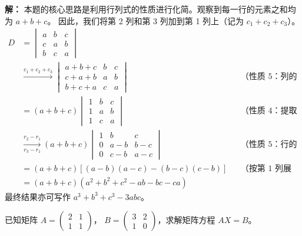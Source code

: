 \documentclass[a4paper, 12pt]{ctexart}
\begin{document}
\noindent\textbf{解：}
本题的核心思路是利用行列式的性质进行化简。观察到每一行的元素之和均为 $a+b+c$。
因此，我们将第 2 列和第 3 列加到第 1 列上（记为 $c_1 + c_2 + c_3$）。
\begin{align*}
    D &= \begin{vmatrix}
        a & b & c \\
        c & a & b \\
        b & c & a
        \end{vmatrix} \\
        &\xrightarrow{c_1+c_2+c_3} \begin{vmatrix}
        a+b+c & b & c \\
        c+a+b & a & b \\
        b+c+a & c & a
        \end{vmatrix} && \text{（性质 5：列的倍加，值不变）} \\
        &= (a+b+c) \begin{vmatrix}
        1 & b & c \\
        1 & a & b \\
        1 & c & a
        \end{vmatrix} && \text{（性质 4：提取第 1 列的公因子）} \\
        &\xrightarrow[r_3-r_1]{r_2-r_1} (a+b+c) \begin{vmatrix}
        1 & b & c \\
        0 & a-b & b-c \\
        0 & c-b & a-c
        \end{vmatrix} && \text{（性质 5：行的倍加，值不变）} \\
        &= (a+b+c) [ (a-b)(a-c) - (b-c)(c-b) ] && \text{（按第 1 列展开）} \\
        &= (a+b+c) (a^2+b^2+c^2-ab-bc-ca)
\end{align*}
最终结果亦可写作 $a^3+b^3+c^3-3abc$。

\vspace{1cm}

\begin{exercise}
    已知矩阵 $A = \begin{pmatrix} 2 & 1 \\ 1 & 1 \end{pmatrix}$， $B = \begin{pmatrix} 3 & 2 \\ 1 & 0 \end{pmatrix}$，求解矩阵方程 $AX=B$。
\end{exercise}
\end{document}
